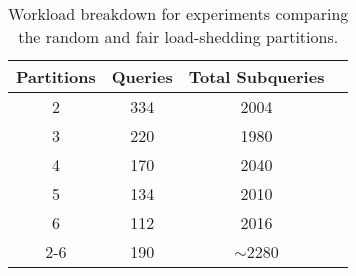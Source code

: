 \begin{table}[t]
  \centering
  \renewcommand{\arraystretch}{1.5}
  \begin{tabular}{|c|c|c|c|} 
  \hline
    \bf Partitions & \bf Queries & \bf Total Subqueries \\ 
    \hline\hline
	2 & 334 & 2004 \\
	\hline 
	3 & 220 & 1980 \\
	\hline
	4 & 170 & 2040 \\
	\hline
	5 & 134 & 2010 \\
	\hline
	6 & 112 & 2016 \\
	\hline
	2-6 & 190 & $\sim$2280 \\
    \hline
  \end{tabular}
  \caption{Workload breakdown for experiments comparing the random and fair \mbox{load-shedding}
  partitions.}
  \label{table:partitions}
\end{table}
